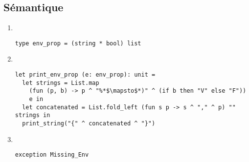 \subsection{Sémantique}

\begin{enumerate}[start=4]
	\item~
		\begin{lstlisting}[language=caml,caption=Définition du type \texttt{env\_prop} représentant un environnement propositionnel]
type env_prop = (string * bool) list
		\end{lstlisting}
	\item~
		\begin{lstlisting}[language=caml,caption=Affichage du type \texttt{env\_prop}]
let print_env_prop (e: env_prop): unit =
  let strings = List.map
    (fun (p, b) -> p ^ "%*$\mapsto$*)" ^ (if b then "V" else "F"))
    e in
  let concatenated = List.fold_left (fun s p -> s ^ "," ^ p) "" strings in
  print_string("{" ^ concatenated ^ "}")
		\end{lstlisting}
	\item~
		\begin{lstlisting}[language=caml,caption=Interprétation d'une formule]
exception Missing_Env


\end{lstlisting}
\end{enumerate}
